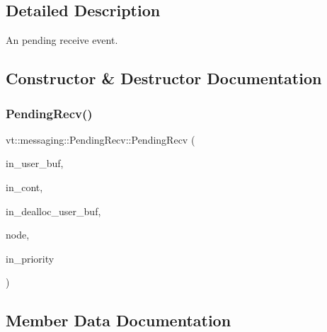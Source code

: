 \subsection{Detailed Description}
An pending receive event. 

\subsection{Constructor \& Destructor Documentation}
\mbox{\label{structvt_1_1messaging_1_1_pending_recv_a8b8d3d9bc971616b5768bf5f643c0fcb}} 
\subsubsection{\texorpdfstring{Pending\+Recv()}{PendingRecv()}}
{\footnotesize\ttfamily vt\+::messaging\+::\+Pending\+Recv\+::\+Pending\+Recv (\begin{DoxyParamCaption}\item[{void $\ast$}]{in\+\_\+user\+\_\+buf,  }\item[{\hyperlink{namespacevt_a4dfad0b5809d9812d60a0311a45ae0c2}{R\+D\+M\+A\+\_\+\+Continuation\+Delete\+Type}}]{in\+\_\+cont,  }\item[{\hyperlink{namespacevt_ae0a5a7b18cc99d7b732cb4d44f46b0f3}{Action\+Type}}]{in\+\_\+dealloc\+\_\+user\+\_\+buf,  }\item[{\hyperlink{namespacevt_a866da9d0efc19c0a1ce79e9e492f47e2}{Node\+Type}}]{node,  }\item[{\hyperlink{namespacevt_a86bff9f556eb761b27fc8600d006ac04}{Priority\+Type}}]{in\+\_\+priority }\end{DoxyParamCaption})\hspace{0.3cm}{\ttfamily [inline]}}



\subsection{Member Data Documentation}
\mbox{\label{structvt_1_1messaging_1_1_pending_recv_a563f27a8d702e5d8f29728d08a154558}} 
